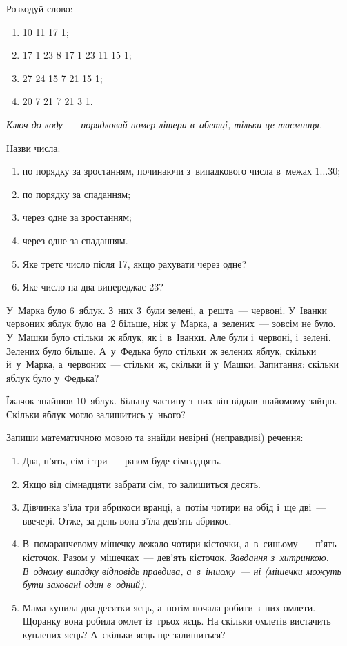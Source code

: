 \problem
Розкодуй слово:
\begin{enumerate}
    \item 10 11 17 1;
    \item 17 1 23 8 17 1 23 11 15 1;
    \item 27 24 15 7 21 15 1;
    \item 20 7 21 7 21 3 1.
\end{enumerate}

\emph{
Ключ до коду~--- порядковий номер літери в~абетці, тільки це таємниця.
}


\problem
Назви числа:
\begin{enumerate}
    \item по порядку за зростанням, починаючи з~випадкового числа
    в~межах $1\ldots30$;
    \item по порядку за спаданням;
    \item через одне за зростанням;
    \item через одне за спаданням.
    \item Яке третє число після 17, якщо рахувати через одне?
    \item Яке число на два випереджає 23?
\end{enumerate}


\problem
У~Марка було 6~яблук. З~них 3~були зелені, а~решта~--- червоні.
У~Іванки червоних яблук було на~2 більше, ніж у~Марка,
а~зелених~--- зовсім не було.
У~Машки було стільки~ж яблук, як і~в~Іванки.
Але були і~червоні, і~зелені. Зелених було більше.
А~у~Федька було стільки~ж зелених яблук, скільки й~у~Марка,
а~червоних~--- стільки~ж, скільки й у~Машки.
Запитання: скільки яблук було у~Федька?


\problem
Їжачок знайшов 10~яблук.
Більшу частину з~них він віддав знайомому зайцю.
Скільки яблук могло залишитись у~нього?


\problem
Запиши математичною мовою та знайди невірні (неправдиві) речення:
\begin{enumerate}
    \item Два, п'ять, сім і три~--- разом буде сімнадцять.
    \item Якщо від сімнадцяти забрати сім, то залишиться десять.
    \item Дівчинка з'їла три абрикоси вранці, а~потім чотири на обід
    і~ще дві~--- ввечері. Отже, за день вона з'їла дев'ять абрикос.
    \item В~помаранчевому мішечку лежало чотири кісточки,
    а~в~синьому~--- п'ять кісточок. Разом у~мішечках~--- дев'ять кісточок.
    \emph{Завдання з~хитринкою. В~одному випадку відповідь правдива,
    а~в~іншому~--- ні (мішечки можуть бути заховані один в~одний).}
    \item Мама купила два десятки яєць, а~потім почала робити з~них омлети.
    Щоранку вона робила омлет із~трьох яєць.
    На скільки омлетів вистачить куплених яєць? А~скільки яєць ще залишиться?
\end{enumerate}


